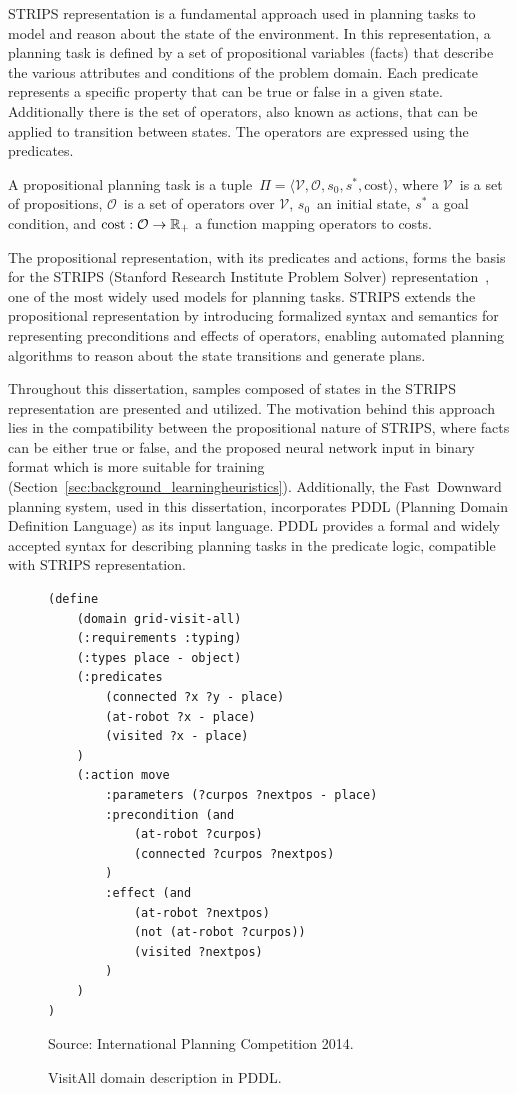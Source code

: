 STRIPS representation is a fundamental approach used in planning tasks to model and reason about the state of the environment. In this representation, a planning task is defined by a set of propositional variables (facts) that describe the various attributes and conditions of the problem domain. Each predicate represents a specific property that can be true or false in a given state. Additionally there is the set of operators, also known as actions, that can be applied to transition between states. The operators are expressed using the predicates.

\begin{definition}
    \label{def:stripsplanningtask}
    A propositional planning task is a tuple~$\Pi=\langle\mathcal{V},\mathcal{O},s_0,s^*, \text{cost}\rangle$, where $\mathcal{V}$~is a set of propositions, $\mathcal{O}$~is a set of operators over $\mathcal{V}$, $s_0$~an initial state, $s^*$ a goal condition, and $\text{cost}:\mathcal{O}\rightarrow\mathbb{R}_{+}$ a function mapping operators to costs.
\end{definition}

The propositional representation, with its predicates and actions, forms the basis for the STRIPS (Stanford Research Institute Problem Solver) representation~\cite{Fikes.Nilsson/1971}, one of the most widely used models for planning tasks. STRIPS extends the propositional representation by introducing formalized syntax and semantics for representing preconditions and effects of operators, enabling automated planning algorithms to reason about the state transitions and generate plans.

Throughout this dissertation, samples composed of states in the STRIPS representation are presented and utilized. The motivation behind this approach lies in the compatibility between the propositional nature of STRIPS, where facts can be either true or false, and the proposed neural network input in binary format which is more suitable for training (Section~\ref{sec:background_learningheuristics}). Additionally, the Fast~Downward planning system, used in this dissertation, incorporates PDDL (Planning Domain Definition Language) as its input language. PDDL provides a formal and widely accepted syntax for describing planning tasks in the predicate logic, compatible with STRIPS representation.

\begin{figure}[ht]
\caption{VisitAll domain description in PDDL.}
\label{fig:pddl}
\addvspace{\baselineskip}
\centering
\begin{lstlisting}[basicstyle=\ttfamily]
(define
    (domain grid-visit-all)
    (:requirements :typing)
    (:types place - object)
    (:predicates
        (connected ?x ?y - place)
        (at-robot ?x - place)
        (visited ?x - place)
    )
    (:action move
        :parameters (?curpos ?nextpos - place)
        :precondition (and
            (at-robot ?curpos)
            (connected ?curpos ?nextpos)
        )
        :effect (and 
            (at-robot ?nextpos)
            (not (at-robot ?curpos))
            (visited ?nextpos)
        )
    )
)
\end{lstlisting}
Source: International Planning Competition 2014.
\end{figure}

